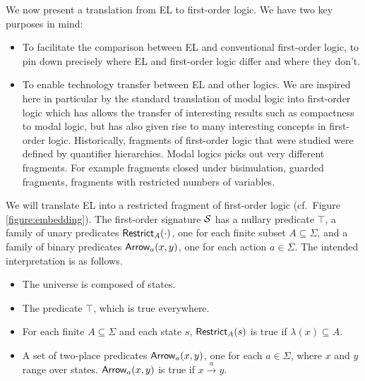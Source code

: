We now present a translation from EL to first-order logic. We have two
key purposes in mind:

\begin{itemize}

\item To facilitate the comparison between EL and conventional
  first-order logic, to pin down precisely where EL and first-order
  logic differ and where they don't.

\item To enable technology transfer between EL and other logics. We
  are inspired here in particular by the standard translation of modal
  logic into first-order logic \cite{BlackburnP:modlog} which has
  allows the transfer of interesting results such as compactness to
  modal logic, but has also given rise to many interesting concepts in
  first-order logic.  Historically, fragments of first-order logic
  that were studied were defined by quantifier hierarchies. Modal
  logics picks out very different fragments. For example fragments
  closed under bisimulation, guarded fragments, fragments with
  restricted numbers of variables.

\end{itemize}



\NI We will translate EL into a restricted fragment of first-order
logic (cf.~Figure \ref{figure:embedding}). The first-order signature
$\mathcal{S}$ has a nullary predicate $\top$, a family of unary predicates
$\mathsf{Restrict}_{A}(\cdot)$, one for each finite subset $A \subseteq
\Sigma$, and a family of binary predicates $\mathsf{Arrow}_{a}(x, y)$, one for
each action $a \in \Sigma$.  The intended interpretation is as
follows.

\begin{itemize}

\item The universe is composed of states.

\item The predicate $\top$, which is true everywhere.

\item For each finite $A \subseteq \Sigma$ and each state $s$,  $\mathsf{Restrict}_{A}(s)$
is true if 
  $\lambda(x) \subseteq A$.

\item A set of two-place predicates $\mathsf{Arrow}_{a}(x, y)$, one for each $a
  \in \Sigma$, where $x$ and $y$ range over states. $\mathsf{Arrow}_{a}(x, y)$
  is true if $x \xrightarrow{a} y$.


\end{itemize}

